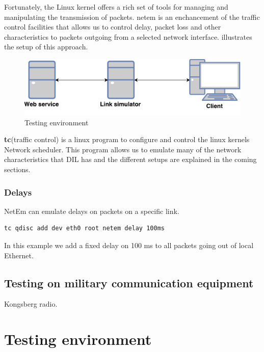 Fortunately, the Linux kernel offers a rich set of tools for managing and
manipulating the transmission of packets. \gls{netem} is an enchancement of the
traffic control facilities that allows us to control delay, packet loss and
other characteristics to packets outgoing from a selected network interface.
 illustrates the setup of this approach.


\begin{figure}[h]
\includegraphics[scale=0.6]{images/testing_environment.pdf}
\caption{Testing environment}
\label{figure-testing-environment}
\end{figure}


\textbf{tc}(traffic control) is a linux program to configure and control the
linux kernels Network scheduler. This program allows us to emulate many of the
network characteristics that DIL has and the different setups are explained in
the coming sections.

\subsubsection{Delays}

NetEm can emulate delays on packets on a specific link.

\begin{lstlisting}[frame=single, caption="Emulating delay"]
  tc qdisc add dev eth0 root netem delay 100ms
\end{lstlisting}

In this example we add a fixed delay on 100 ms to all packets going out of local
Ethernet.

\subsection{Testing on military communication equipment}
Kongsberg radio.


\section{Testing environment}
\label{testing-environment}

